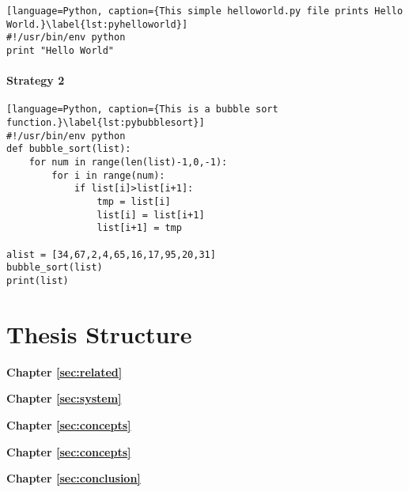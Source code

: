 \begin{lstlisting}[language=Python, caption={This simple helloworld.py file prints Hello World.}\label{lst:pyhelloworld}]
#!/usr/bin/env python
print "Hello World"
\end{lstlisting}

\paragraph{Strategy 2}
\Blindtext[1][1]

\begin{lstlisting}[language=Python, caption={This is a bubble sort function.}\label{lst:pybubblesort}]
#!/usr/bin/env python
def bubble_sort(list):
    for num in range(len(list)-1,0,-1):
        for i in range(num):
            if list[i]>list[i+1]:
                tmp = list[i]
                list[i] = list[i+1]
                list[i+1] = tmp

alist = [34,67,2,4,65,16,17,95,20,31]
bubble_sort(list)
print(list)
\end{lstlisting}

\section{Thesis Structure}
\label{sec:intro:structure}

\textbf{Chapter \ref{sec:related}} \\[0.2em]
\blindtext

\textbf{Chapter \ref{sec:system}} \\[0.2em]
\blindtext

\textbf{Chapter \ref{sec:concepts}} \\[0.2em]
\blindtext

\textbf{Chapter \ref{sec:concepts}} \\[0.2em]
\blindtext

\textbf{Chapter \ref{sec:conclusion}} \\[0.2em]
\blindtext
